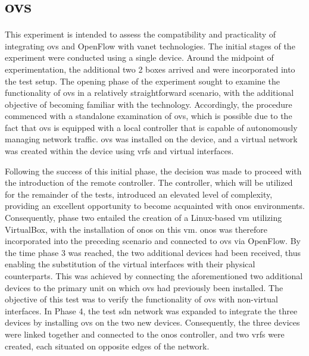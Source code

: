 \section[OvS]{\gls{ovs}}
This experiment is intended to assess the compatibility and practicality of integrating \gls{ovs} and OpenFlow with \gls{vanet} technologies. The initial stages of the experiment were conducted using a single device. Around the midpoint of experimentation, the additional two 2 boxes arrived and were incorporated into the test setup.
The opening phase of the experiment sought to examine the functionality of \gls{ovs} in a relatively straightforward scenario, with the additional objective of becoming familiar with the technology. Accordingly, the procedure commenced with a standalone examination of \gls{ovs}, which is possible due to the fact that \gls{ovs} is equipped with a local controller that is capable of autonomously managing network traffic. \gls{ovs} was installed on the device, and a virtual network was created within the device using \glspl{vrf} and virtual interfaces.



Following the success of this initial phase, the decision was made to proceed with the introduction of the remote controller. The controller, which will be utilized for the remainder of the tests, introduced an elevated level of complexity, providing an excellent opportunity to become acquainted with \gls{onos} environments. Consequently, phase two entailed the creation of a Linux-based \gls{vm} utilizing VirtualBox, with the installation of \gls{onos} on this \gls{vm}. \gls{onos} was therefore incorporated into the preceding scenario and connected to \gls{ovs} via OpenFlow.
By the time phase 3 was reached, the two additional devices had been received, thus enabling the substitution of the virtual interfaces with their physical counterparts. This was achieved by connecting the aforementioned two additional devices to the primary unit on which \gls{ovs} had previously been installed. The objective of this test was to verify the functionality of \gls{ovs} with non-virtual interfaces.
In Phase 4, the test \gls{sdn} network was expanded to integrate the three devices by installing \gls{ovs} on the two new devices. Consequently, the three devices were linked together and connected to the \gls{onos} controller, and two \glspl{vrf} were created, each situated on opposite edges of the network. 

